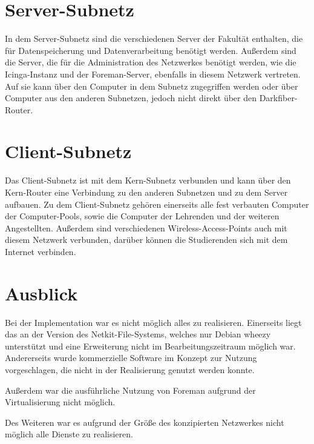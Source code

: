 \section{Server-Subnetz}
In dem Server-Subnetz sind die verschiedenen Server der Fakultät enthalten, die für Datenspeicherung und Datenverarbeitung benötigt werden. Außerdem sind die Server, die für die Administration des Netzwerkes benötigt werden, wie die Icinga-Instanz und der Foreman-Server, ebenfalls in diesem Netzwerk vertreten. Auf sie kann über den Computer in dem Subnetz zugegriffen werden oder über Computer aus den anderen Subnetzen, jedoch nicht direkt über den Darkfiber-Router.

\section{Client-Subnetz}
Das Client-Subnetz ist mit dem Kern-Subnetz verbunden und kann über den Kern-Router eine Verbindung zu den anderen Subnetzen und zu dem Server aufbauen. Zu dem Client-Subnetz gehören einerseits alle fest verbauten Computer der Computer-Pools, sowie die Computer der Lehrenden und der weiteren Angestellten. Außerdem sind verschiedenen Wireless-Access-Points auch mit diesem Netzwerk verbunden, darüber können die Studierenden sich mit dem Internet verbinden.

\section{Ausblick}
Bei der Implementation war es nicht möglich alles zu realisieren. Einerseits liegt das an der Version des Netkit-File-Systems, welches nur Debian wheezy unterstützt und eine Erweiterung nicht im Bearbeitungszeitraum möglich war. Andererseits wurde kommerzielle Software im Konzept zur Nutzung vorgeschlagen, die nicht in der Realisierung genutzt werden konnte.

Außerdem war die ausführliche Nutzung von Foreman aufgrund der Virtualisierung nicht möglich.

Des Weiteren war es aufgrund der Größe des konzipierten Netzwerkes nicht möglich alle Dienste zu realisieren.